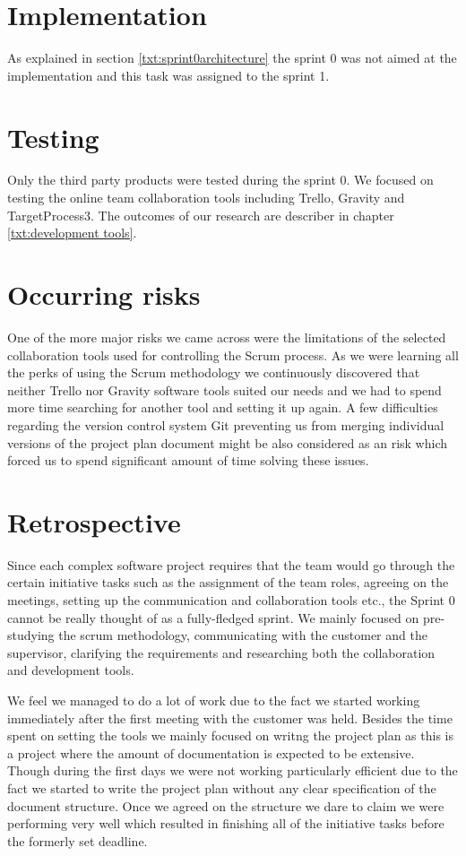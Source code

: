 \section{Implementation}

As explained in section \ref{txt:sprint0architecture} the sprint 0 was not aimed at the implementation and this task was assigned to the sprint 1.

\section{Testing}

Only the third party products were tested during the sprint 0. We focused on testing the online team collaboration tools including Trello, Gravity and TargetProcess3. The outcomes of our research are describer in chapter \ref{txt:development tools}.

\section{Occurring risks}

One of the more major risks we came across were the limitations of the selected collaboration tools used for controlling the Scrum process. As we were learning all the perks of using the Scrum methodology we continuously discovered that neither Trello nor Gravity software tools suited our needs and we had to spend more time searching for another tool and setting it up again. A few difficulties regarding the version control system Git preventing us from merging individual versions of the project plan document might be also considered as an risk which forced us to spend significant amount of time solving these issues.

\section{Retrospective}

Since each complex software project requires that the team would go through the certain initiative tasks such as the assignment of the team roles, agreeing on the meetings, setting up the communication and collaboration tools etc., the Sprint 0 cannot be really thought of as a fully-fledged sprint. We mainly focused on pre-studying the scrum methodology, communicating with the customer and the supervisor, clarifying the requirements and researching both the collaboration and development tools.

We feel we managed to do a lot of work due to the fact we started working immediately after the first meeting with the customer was held. Besides the time spent on setting the tools we mainly focused on writng the project plan as this is a project where the amount of documentation is expected to be extensive. Though during the first days we were not working particularly efficient due to the fact we started to write the project plan without any clear specification of the document structure. Once we agreed on the structure we dare to claim we were performing very well which resulted in finishing all of the initiative tasks before the formerly set deadline.

